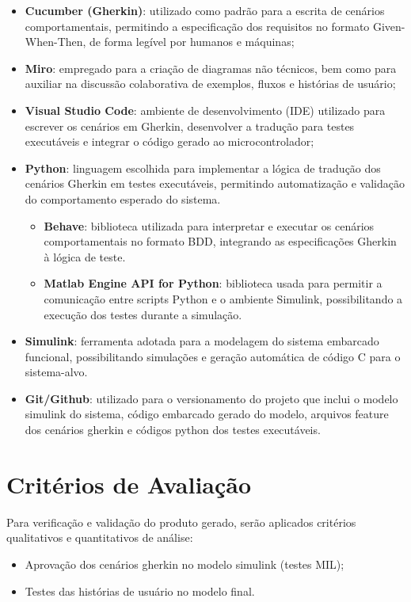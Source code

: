 \begin{itemize}
    \item \textbf{Cucumber (Gherkin)}: utilizado como padrão para a escrita de cenários comportamentais, permitindo a especificação dos requisitos no formato Given-When-Then, de forma legível por humanos e máquinas;
    \item \textbf{Miro}: empregado para a criação de diagramas não técnicos, bem como para auxiliar na discussão colaborativa de exemplos, fluxos e histórias de usuário;
    \item \textbf{Visual Studio Code}: ambiente de desenvolvimento (IDE) utilizado para escrever os cenários em Gherkin, desenvolver a tradução para testes executáveis e integrar o código gerado ao microcontrolador;
    \item \textbf{Python}: linguagem escolhida para implementar a lógica de tradução dos cenários Gherkin em testes executáveis, permitindo automatização e validação do comportamento esperado do sistema.
    \begin{itemize}
        \item \textbf{Behave}: biblioteca utilizada para interpretar e executar os cenários comportamentais no formato BDD, integrando as especificações Gherkin à lógica de teste.
        \item \textbf{Matlab Engine API for Python}: biblioteca usada para permitir a comunicação entre scripts Python e o ambiente Simulink, possibilitando a execução dos testes durante a simulação.
    \end{itemize}    
    \item \textbf{Simulink}: ferramenta adotada para a modelagem do sistema embarcado funcional, possibilitando simulações e geração automática de código C para o sistema-alvo.
    \item \textbf{Git/Github}: utilizado para o versionamento do projeto que inclui o modelo simulink do sistema, código embarcado gerado do modelo, arquivos feature dos cenários gherkin e códigos python dos testes executáveis.

\end{itemize}




\section{Critérios de Avaliação}
Para verificação e validação do produto gerado, serão aplicados critérios qualitativos e quantitativos de análise:
\begin{itemize}
    \item Aprovação dos cenários gherkin no modelo simulink (testes MIL);
    \item Testes das histórias de usuário no modelo final.
\end{itemize}

